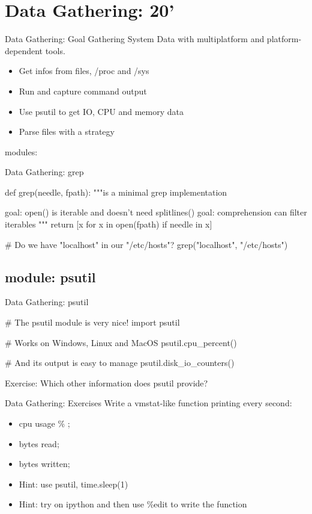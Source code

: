 \section{Data Gathering: 20'}
%
%


\begin{pyframe}{Data Gathering: Goal}
    Gathering System Data with multiplatform
     and platform-dependent tools.
\begin{itemize}
\item Get infos from files, /proc and /sys 
\item Run and capture command output
\item Use psutil to get IO, CPU and memory data
\item Parse files with a strategy
\end{itemize}
modules: 
\end{pyframe}


\begin{pyframe}{Data Gathering: grep}
\begin{pycode}
def grep(needle, fpath):
    """is a minimal grep implementation

       goal: open() is iterable and doesn't
             need splitlines()
       goal: comprehension can filter iterables
    """
    return [x for x in open(fpath) if needle in x]
    
# Do we have "localhost" in our "/etc/hosts"?
grep("localhost", "/etc/hosts")
\end{pycode}
\end{pyframe}

\subsection{module: psutil}
\begin{pyframe}{Data Gathering: psutil}
\begin{pycode}
# The psutil module is very nice!
import psutil

# Works on Windows, Linux and MacOS
psutil.cpu_percent()

# And its output is easy to manage
psutil.disk_io_counters()

\end{pycode}
Exercise: Which other information does psutil provide?
\end{pyframe}


\begin{pyframe}{Data Gathering: Exercises}
Write a vmstat-like function printing every second:
\begin{itemize}
\item cpu usage \% ;
\item bytes read;
\item bytes written;
\item Hint: use psutil, time.sleep(1)
\item Hint: try on ipython and then use \%edit to write the function
\end{itemize}
\end{pyframe}

